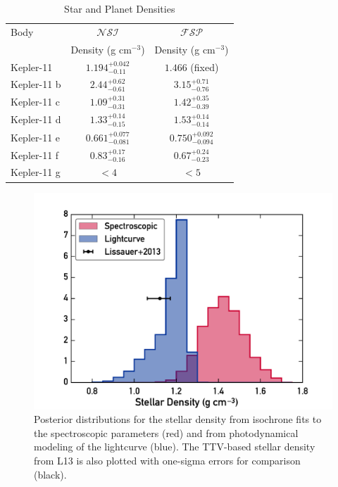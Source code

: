 \documentclass[oneside]{emulateapj}
\begin{document}
\begin{table}
\caption{Star and Planet Densities}
\label{table:den}
\centering 
\begin{tabular}{l c c} 
\hline
Body & $\mathcal{NSI}$ & $\mathcal{FSP}$  \\
 & Density (g cm$^{-3}$)  & Density (g cm$^{-3}$) \\
\hline
Kepler-11    & $1.194^{+0.042}_{-0.11} $& $1.466 $ (fixed) \\
Kepler-11 b & $2.44^{+0.62}_{-0.61} $ & $ 3.15^{+0.71}_{-0.76} $  \\
Kepler-11 c &  $ 1.09^{+0.31}_{-0.31} $ &$ 1.42^{+0.35}_{-0.39} $ \\
Kepler-11 d &  $ 1.33^{+0.14}_{-0.15} $ & $ 1.53^{+0.14}_{-0.14} $ \\
Kepler-11 e &  $ 0.661^{+0.077}_{-0.081} $ & $ 0.750^{+0.092}_{-0.094} $ \\
Kepler-11 f &  $ 0.83^{+0.17}_{-0.16} $  &$ 0.67^{+0.24}_{-0.23} $  \\
Kepler-11 g &  $ <  4 $ & $ < 5 $\\
\hline       
\end{tabular}

\end{table}



\begin{figure}
\centering
\includegraphics[width=\columnwidth]{density}
\caption{Posterior distributions for the stellar density from isochrone fits to the spectroscopic parameters (red) and from photodynamical modeling of the lightcurve (blue). The TTV-based stellar density from L13 is also plotted with one-sigma errors for comparison (black).}
\label{fig:densities}
\end{figure}
\end{document}
